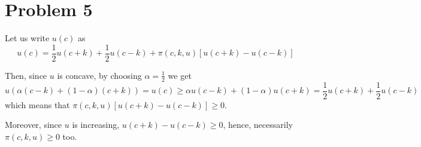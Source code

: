 \documentclass[12pt]{extarticle}
\numberwithin{table}{section}
\numberwithin{figure}{section}
\numberwithin{equation}{section}
\begin{document}
\section*{Problem 5}

Let us write $u(c)$ as
\begin{equation}
    u(c) = \frac{1}{2} u(c + k) + \frac{1}{2} u(c-k) + \pi(c, k, u) [ u(c + k) - u(c-k)]
\end{equation}

Then, since $u$ is concave, by choosing $\alpha = \frac{1}{2}$ we get
\begin{equation}
    u(\alpha (c - k) + (1-\alpha) (c + k)) = u(c) \geq \alpha u(c - k) + (1-\alpha) u(c+k) = \frac{1}{2} u(c + k) + \frac{1}{2} u(c-k)
\end{equation}
which means that $\pi(c, k, u) [ u(c + k) - u(c-k)] \geq 0$.

Moreover, since $u$ is increasing, $u(c + k) - u(c-k) \geq 0$, hence, necessarily $\pi(c, k, u) \geq 0$ too.
\end{document}

